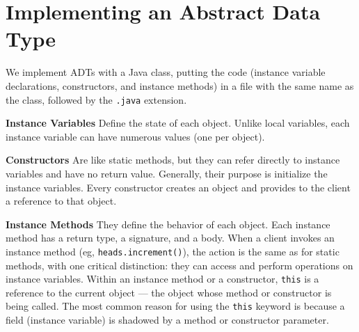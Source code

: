 \documentclass[8pt,a4paper,compress]{beamer}
\begin{document}
\section{Implementing an Abstract Data Type}
\begin{frame}[fragile]
\pause

We implement ADTs with a Java class, putting the code (instance variable declarations, constructors, and instance methods) in a file with the same name as the class, followed by the \lstinline$.java$ extension. 

\pause
\smallskip

\textbf{Instance Variables} Define the state of each object. Unlike local variables, each instance variable can have numerous values (one per object).

\pause
\smallskip

\textbf{Constructors} Are like static methods, but they can refer directly to instance variables and have no return value. Generally, their purpose is initialize the instance variables. Every constructor creates an object and provides to the client a reference to that object.

\pause
\smallskip

\textbf{Instance Methods} They define the behavior of each object. Each instance method has a return type, a signature, and a body. When a client invokes an instance method (eg, \lstinline$heads.increment()$), the action is the same as for
static methods, with one critical distinction: they can access
and perform operations on instance variables. Within an instance method or a constructor, \lstinline$this$ is a reference to the current object --- the object whose method or constructor is being called. The most common reason for using the \lstinline$this$ keyword is because a field (instance variable) is shadowed by a method or constructor parameter.
\end{frame}
\end{document}
